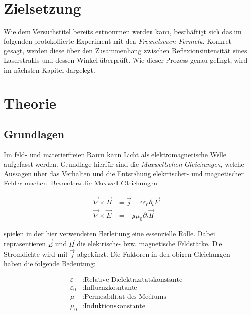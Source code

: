 



\section{Zielsetzung}
\label{sec:Zielsetzung}

Wie dem Versuchstitel bereits entnommen werden kann, beschäftigt sich das im folgenden protokollierte Experiment mit den \emph{Fresnelschen Formeln}.
Konkret gesagt, werden diese über den Zusammenhang zwischen Reflexionsintensität eines Laserstrahls und dessen Winkel überprüft. Wie dieser Prozess genau 
gelingt, wird im nächsten Kapitel dargelegt. 

\section{Theorie}
\label{sec:Theorie}


\subsection{Grundlagen}
\label{sec:Grundlagen}

Im feld- und materierfreien Raum kann Licht als elektromagnetische Welle aufgefasst werden. Grundlage hierfür sind die \emph{Maxwellschen Gleichungen}, 
welche Aussagen über das Verhalten und die Entstehung elektrischer- und magnetischer Felder machen. Besonders die Maxwell Gleichungen

\begin{align}
\label{eqn:MW34}
    \vec{\nabla}\times\vec{H} &= \vec{j} + \varepsilon\varepsilon_0\partial_{t}\vec{E}\\
    \vec{\nabla}\times\vec{E} &= -\mu\mu_0\partial_{t}\vec{H}
\end{align}

\noindent spielen in der hier verwendeten Herleitung eine essenzielle Rolle. Dabei repräsentieren $\vec{E}$ und $\vec{H}$ die elektrische- bzw. magnetische 
Feldstärke. Die Stromdichte wird mit $\vec{j}$ abgekürzt. Die Faktoren in den obigen Gleichungen haben die folgende Bedeutung:

\begin{align*}
    \varepsilon &: \text{Relative Dielektrizitätskonstante}\\
    \varepsilon_0 &: \text{Influenzkosntante}\\
    \mu &: \text{Permeabilität des Mediums}\\
    \mu_0 &: \text{Induktionskonstante}
\end{align*}

